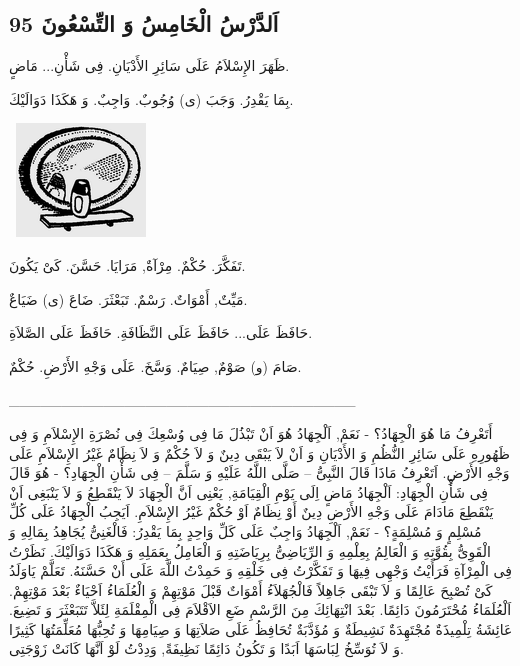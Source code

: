 \documentclass[a5paper]{article}
\begin{document}
\subsection{اَلدَّرْسُ الْخَامِسُ وَ التِّسْعُونَ 95}
ظَهَرَ الإِسْلاَمُ عَلَى سَائِرِ الأَدْيَانِ. فِى شَأْنِ... مَاضٍ.

بِمَا يَقْدِرُ. وَجَبَ (ى) وُجُوبٌ. وَاجِبٌ. وَ هَكَذَا دَوَالَيْكَ. 

\  \includegraphics[width=1.3543in,height=1.1874in]{images/MuhammadBagauddinprettified-img268.png} 

تَفَكَّرَ. حُكْمٌ. مِرْآةٌ, مَرَايَا. حَسَّنَ. كَىْ يَكُونَ. 

مَيِّتٌ, أَمْوَاتٌ. رَسْمٌ. تَبَعْثَرَ. ضَاعَ (ى) ضَيَاعٌ.

حَافَظَ عَلَى... حَافَظَ عَلَى النَّظَافَةِ. حَافَظَ عَلَى الصَّلاَةِ. 

صَامَ (و) صَوْمٌ, صِيَامٌ. وَسَّخَ. عَلَى وَجْهِ الأَرْضِ. حُكْمٌ.

\_\_\_\_\_\_\_\_\_\_\_\_\_\_\_\_\_\_\_\_\_\_\_\_\_\_\_\_\_\_\_\_\_

أَتَعْرِفُ مَا هُوَ الْجِهَادُ؟ - نَعَمْ, اَلْجِهَادُ هُوَ اَنْ تَبْذُلَ مَا فِى وُسْعِكَ فِى نُصْرَةِ الإِسْلاَمِ وَ فِى ظَهُورِهِ عَلَى سَائِرِ النُّظُمِ وَ الأَدْيَانِ وَ اَنْ لاَ يَبْقَى دِينٌ وَ لاَ حُكْمٌ وَ لاَ نِظَامٌ غَيْرُ الإِسْلاَمِ عَلَى وَجْهِ الأَرْضِ. اَتَعْرِفُ مَاذَا قَالَ النَّبِىُّ – صَلَّى اللَّهُ عَلَيْهِ وَ سَلَّمَ – فِى شَأْنِ الْجِهَادِ؟ - هُوَ قَالَ فِى شَأْنِ الْجِهَادِ: اَلْجِهَادُ مَاضٍ اِلَى يَوْمِ الْقِيَامَةِ, يَعْنِى اَنَّ الْجِهَادَ لاَ يَنْقَطِعُ وَ لاَ يَنْبَغِى اَنْ يَنْقَطِعَ مَادَامَ عَلَى وَجْهِ الأَرْضِ دِينٌ أَوْ نِظَامٌ اَوْ حُكْمٌ غَيْرُ الإِسْلاَمِ. اَيَجِبُ الْجِهَادُ عَلَى كُلِّ مُسْلِمٍ وَ مُسْلِمَةٍ؟ - نَعَمْ, اَلْجِهَادُ وَاجِبٌ عَلَى كَلِّ وَاحِدٍ بِمَا يَقْدِرُ: فَالْغَنِىُّ يُجَاهِدُ بِمَالِهِ وَ الْقَوِىُّ بِقُوَّتِهِ وَ الْعَالِمُ بِعِلْمِهِ وَ الرِّيَاضِىُّ بِرِيَاضَتِهِ وَ الْعَامِلُ بِعَمَلِهِ وَ هَكَذَا دَوَالَيْكَ. نَظَرْتُ فِى الْمِرْآةِ فَرَأَيْتُ وَجْهِى فِيهَا وَ تَفَكَّرْتُ فِى خَلْقِهِ وَ حَمِدْتُ اللَّهَ عَلَى أَنْ حَسَّنَهُ. تَعَلَّمْ يَاوَلَدُ كَىْ تُصْبِحَ عَالِمًا وَ لاَ تَبْقَى جَاهِلاً فَالْجُهَلاَءُ أَمْوَاتٌ قَبْلَ مَوْتِهِمْ وَ الْعُلَمَاءُ اَحْيَاءٌ بَعْدَ مَوْتِهِمْ. اَلْعُلَمَاءُ مُحْتَرَمُونَ دَائِمًا. بَعْدَ انْتِهَائِكَ مِنَ الرَّسْمِ ضَعِ الاَقْلاَمَ فِى الْمِقْلَمَةِ لِئَلاَّ تَتَبَعْثَرَ وَ تَضِيعَ. عَائِشَةُ تِلْمِيذَةٌ مُجْتَهِدَةٌ نَشِيطَةٌ وَ مُؤَدَّبَةٌ تُحَافِظُ عَلَى صَلاَتِهَا وَ صِيَامِهَا وَ تُحِبُّهَا مُعَلِّمَتُهَا كَثِيرًا وَ لاَ تُوَسِّخُ لِبَاسَهَا اَبَدًا وَ تَكُونُ دَائِمًا نَظِيفَةً, وَدِدْتُ لَوْ اَنَّهَا كَانَتْ زَوْجَتِى.
\end{document}
